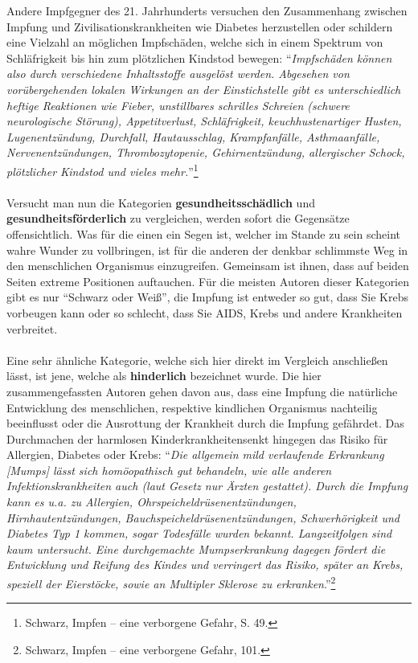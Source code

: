 \documentclass[
    a4paper,
    12pt,
    hyphens,
    chapterprefix=true,
    headheight=33pt,
    footheight=29pt,
    headings=optiontohead, %
]{scrartcl}
\begin{document}
{Andere Impfgegner des 21. Jahrhunderts versuchen den Zusammenhang zwischen Impfung und Zivilisationskrankheiten wie Diabetes herzustellen oder schildern eine Vielzahl an möglichen Impfschäden, welche sich in einem Spektrum von Schläfrigkeit bis hin zum plötzlichen Kindstod bewegen: "`\textit{Impfschäden können also durch verschiedene Inhaltsstoffe ausgelöst werden. Abgesehen von vorübergehenden lokalen Wirkungen an der Einstichstelle gibt es unterschiedlich heftige Reaktionen wie Fieber, unstillbares schrilles Schreien (schwere neurologische Störung), Appetitverlust, Schläfrigkeit, keuchhustenartiger Husten, Lugenentzündung, Durchfall, Hautausschlag, Krampfanfälle, Asthmaanfälle, Nervenentzündungen, Thrombozytopenie, Gehirnentzündung, allergischer Schock, plötzlicher Kindstod und vieles mehr.}"'\footnote{Schwarz, Impfen -- eine verborgene Gefahr, S. 49.}\\
\\
Versucht man nun die Kategorien \textbf{gesundheitsschädlich} und \textbf{gesundheitsförderlich} zu vergleichen, werden sofort die Gegensätze offensichtlich. Was für die einen ein Segen ist, welcher im Stande zu sein scheint wahre Wunder zu vollbringen, ist für die anderen der denkbar schlimmste Weg in den menschlichen Organismus einzugreifen. Gemeinsam ist ihnen, dass auf beiden Seiten extreme Positionen auftauchen. Für die meisten Autoren dieser Kategorien gibt es nur "`Schwarz oder Weiß"', die Impfung ist entweder so gut, dass Sie Krebs vorbeugen kann oder so schlecht, dass Sie AIDS, Krebs und andere Krankheiten verbreitet. \\
\\
Eine sehr ähnliche Kategorie, welche sich hier direkt im Vergleich anschließen lässt, ist jene, welche als \textbf{hinderlich} bezeichnet wurde. Die hier zusammengefassten Autoren gehen davon aus, dass eine Impfung die natürliche Entwicklung des menschlichen, respektive kindlichen Organismus nachteilig beeinflusst oder die Ausrottung der Krankheit durch die Impfung gefährdet. Das Durchmachen der \glqq harmlosen Kinderkrankheiten\grqq senkt hingegen das Risiko für Allergien, Diabetes oder Krebs: "`\textit{Die allgemein mild verlaufende Erkrankung [Mumps] lässt sich homöopathisch gut behandeln, wie alle anderen Infektionskrankheiten auch (laut Gesetz nur Ärzten gestattet). Durch die Impfung kann es u.a. zu Allergien, Ohrspeicheldrüsenentzündungen, Hirnhautentzündungen, Bauchspeicheldrüsenentzündungen, Schwerhörigkeit und Diabetes Typ 1 kommen, sogar Todesfälle wurden bekannt. Langzeitfolgen sind kaum untersucht. Eine durchgemachte Mumpserkrankung dagegen fördert die Entwicklung und Reifung des Kindes und verringert das Risiko, später an Krebs, speziell der Eierstöcke, sowie an Multipler Sklerose zu erkranken}."'\footnote{Schwarz, Impfen -- eine verborgene Gefahr, 101.}\\
}
\end{document}
